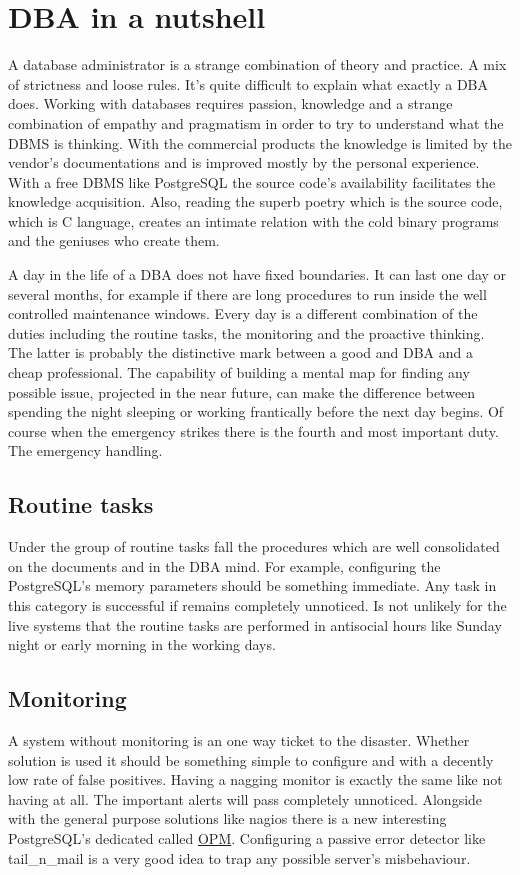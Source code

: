 \chapter{DBA in a nutshell}
A database administrator is a strange combination of theory and practice. A mix of strictness and loose 
rules. It's quite difficult to explain what exactly a DBA does. Working with databases requires passion, 
knowledge and a strange combination of empathy and pragmatism in order to try to understand what the 
DBMS is thinking. With the commercial products the knowledge is limited by the vendor's documentations 
and is improved mostly by the personal experience. With a free DBMS like PostgreSQL the source code's 
availability facilitates the knowledge acquisition. Also, reading the superb poetry which is the source 
code, which is C language, creates an intimate relation with the cold binary programs and the 
geniuses who create them.\newline

A day in the life of a DBA does not have fixed boundaries. It can last one day or several months, for 
example if there are long procedures to run inside the well controlled maintenance windows. Every day 
is a different combination of the duties including the routine tasks, the monitoring and the proactive 
thinking. The latter is probably the distinctive mark between a good and DBA and a cheap professional. 
The capability of building a mental map for finding any possible issue, projected in the near future, can 
make the difference between spending the night sleeping or working frantically before the next day begins. 
Of course when the emergency strikes there is the fourth and most important duty. The emergency handling. 

\section{Routine tasks}
Under the group of routine tasks fall the procedures which are well consolidated on the documents and in 
the DBA mind. For example, configuring the PostgreSQL's memory parameters should be something immediate. 
Any task in this category is successful if remains completely unnoticed. Is not unlikely for the live 
systems that the routine tasks are performed in antisocial hours like Sunday night or early morning in the 
working days.

\section{Monitoring}
A system without monitoring is an one way ticket to the disaster. Whether solution is used it should be 
something simple to configure and with a decently low rate of false positives. Having a nagging monitor is 
exactly the same like not having at all. The important alerts will pass completely unnoticed. Alongside 
with the general purpose solutions like nagios there is a new interesting PostgreSQL's dedicated called 
\href{http://opm.io/}{OPM}. Configuring a passive error detector like tail\_n\_mail is a very good idea to 
trap any possible server's misbehaviour. 


